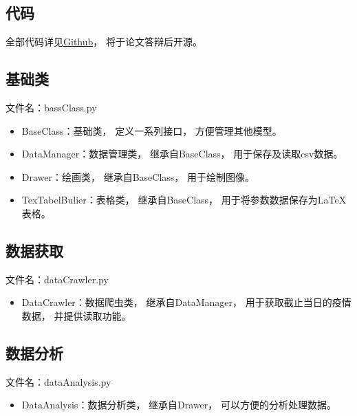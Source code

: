 \begin{appendix}
      \section{代码}
      全部代码详见\href{https://github.com/luotianqi777/Paper}{Github}，
      将于论文答辩后开源。
      \subsection{基础类}
      \par 文件名：bassClass.py
      \begin{itemize}
            \item BaseClass：基础类，
                  定义一系列接口，
                  方便管理其他模型。
            \item DataManager：数据管理类，
                  继承自BaseClass，
                  用于保存及读取csv数据。
            \item Drawer：绘画类，
                  继承自BaseClass，
                  用于绘制图像。
            \item TexTabelBulier：表格类，
                  继承自BaseClass，
                  用于将参数数据保存为LaTeX表格。
      \end{itemize}
      
      \subsection{数据获取}
      \par 文件名：dataCrawler.py
      \begin{itemize}
            \item DataCrawler：数据爬虫类，
                  继承自DataManager，
                  用于获取截止当日的疫情数据，
                  并提供读取功能。
      \end{itemize}
      
      \subsection{数据分析}
      \par 文件名：dataAnalysis.py
      \begin{itemize}
            \item DataAnalysis：数据分析类，
                  继承自Drawer，
                  可以方便的分析处理数据。
      \end{itemize}
      

\end{appendix}
